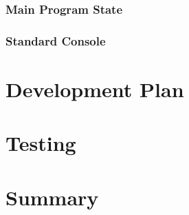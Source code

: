 \documentclass[11pt]{article} %
\begin{document}
\subsubsection{Main Program State}
\subsubsection{Standard Console}
\section{Development Plan}


\section{Testing}


\section{Summary}

\end{document}
